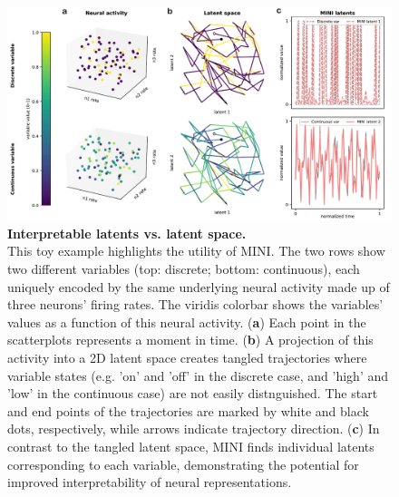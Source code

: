 \begin{figure}[h]
    \centering
    \includegraphics[width=\linewidth]{figures/interpretable_latents_vs_latent_space.pdf}
    \caption{
        \textbf{Interpretable latents vs. latent space.} \\
        \small This toy example highlights the utility of MINI. The two rows show two different variables (top: discrete; bottom: continuous), each uniquely encoded by the same underlying neural activity made up of three neurons' firing rates. The viridis colorbar shows the variables' values as a function of this neural activity. (\textbf{a}) Each point in the scatterplots represents a moment in time. (\textbf{b}) A projection of this activity into a 2D latent space creates tangled trajectories where variable states (e.g. 'on' and 'off' in the discrete case, and 'high' and 'low' in the continuous case) are not easily distnguished. The start and end points of the trajectories are marked by white and black dots, respectively, while arrows indicate trajectory direction. (\textbf{c}) In contrast to the tangled latent space, MINI finds individual latents corresponding to each variable, demonstrating the potential for improved interpretability of neural representations.
    }
    \label{fig:interpretable_latents_vs_latent_space}
\end{figure}